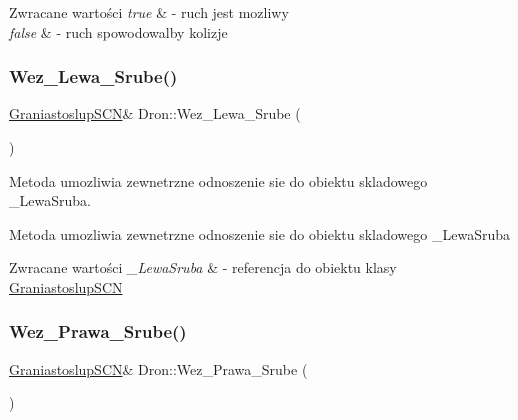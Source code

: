 \begin{DoxyRetVals}{Zwracane wartości}
{\em true} & -\/ ruch jest mozliwy \\
\hline
{\em false} & -\/ ruch spowodowalby kolizje \\
\hline
\end{DoxyRetVals}
\mbox{\label{classDron_a18b1d0162c88a8e93322d6eb5d7b64f0}} 
\subsubsection{\texorpdfstring{Wez\+\_\+\+Lewa\+\_\+\+Srube()}{Wez\_Lewa\_Srube()}}
{\footnotesize\ttfamily \hyperlink{classGraniastoslupSCN}{Graniastoslup\+S\+CN}\& Dron\+::\+Wez\+\_\+\+Lewa\+\_\+\+Srube (\begin{DoxyParamCaption}{ }\end{DoxyParamCaption})\hspace{0.3cm}{\ttfamily [inline]}}



Metoda umozliwia zewnetrzne odnoszenie sie do obiektu skladowego \+\_\+\+Lewa\+Sruba. 

Metoda umozliwia zewnetrzne odnoszenie sie do obiektu skladowego \+\_\+\+Lewa\+Sruba 
\begin{DoxyRetVals}{Zwracane wartości}
{\em \+\_\+\+Lewa\+Sruba} & -\/ referencja do obiektu klasy \hyperlink{classGraniastoslupSCN}{Graniastoslup\+S\+CN} \\
\hline
\end{DoxyRetVals}
\mbox{\label{classDron_a1bdfbac069ae0f0ef1b168f0f2d9bc6e}} 
\subsubsection{\texorpdfstring{Wez\+\_\+\+Prawa\+\_\+\+Srube()}{Wez\_Prawa\_Srube()}}
{\footnotesize\ttfamily \hyperlink{classGraniastoslupSCN}{Graniastoslup\+S\+CN}\& Dron\+::\+Wez\+\_\+\+Prawa\+\_\+\+Srube (\begin{DoxyParamCaption}{ }\end{DoxyParamCaption})\hspace{0.3cm}{\ttfamily [inline]}}



